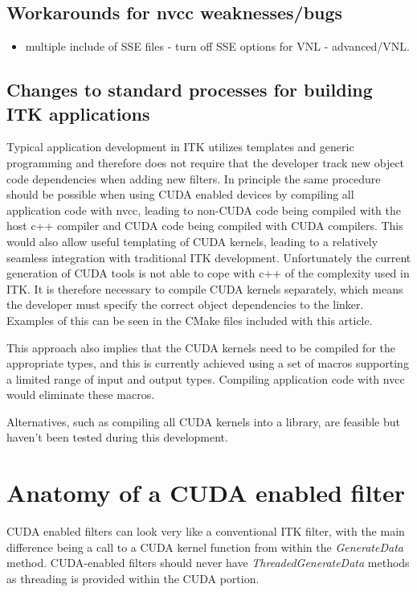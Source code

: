 \documentclass{InsightArticle}
\begin{document}
\subsection{Workarounds for nvcc weaknesses/bugs}
\begin{itemize}
  \item multiple include of SSE files - turn off SSE options for VNL - advanced/VNL.
\end{itemize}


\subsection{Changes to standard processes for building ITK applications}
Typical application development in ITK utilizes templates and generic
programming and therefore does not require that the developer track
new object code dependencies when adding new filters. In principle the
same procedure should be possible when using CUDA enabled devices by
compiling all application code with nvcc, leading to non-CUDA code
being compiled with the host c++ compiler and CUDA code being compiled
with CUDA compilers. This would also allow useful templating of CUDA
kernels, leading to a relatively seamless integration with traditional
ITK development. Unfortunately the current generation of CUDA tools is
not able to cope with c++ of the complexity used in ITK. It is
therefore necessary to compile CUDA kernels separately, which means
the developer must specify the correct object dependencies to the
linker. Examples of this can be seen in the CMake files included with
this article.

This approach also implies that the CUDA kernels need to be compiled
for the appropriate types, and this is currently achieved using a set
of macros supporting a limited range of input and output
types. Compiling application code with nvcc would eliminate these
macros.

Alternatives, such as compiling all CUDA kernels into a library, are
feasible but haven't been tested during this development.



\section{Anatomy of a CUDA enabled filter}
CUDA enabled filters can look very like a conventional ITK filter,
with the main difference being a call to a CUDA kernel function from
within the {\em GenerateData} method. CUDA-enabled filters should
never have {\em ThreadedGenerateData} methods as threading is provided
within the CUDA portion.
\end{document}
